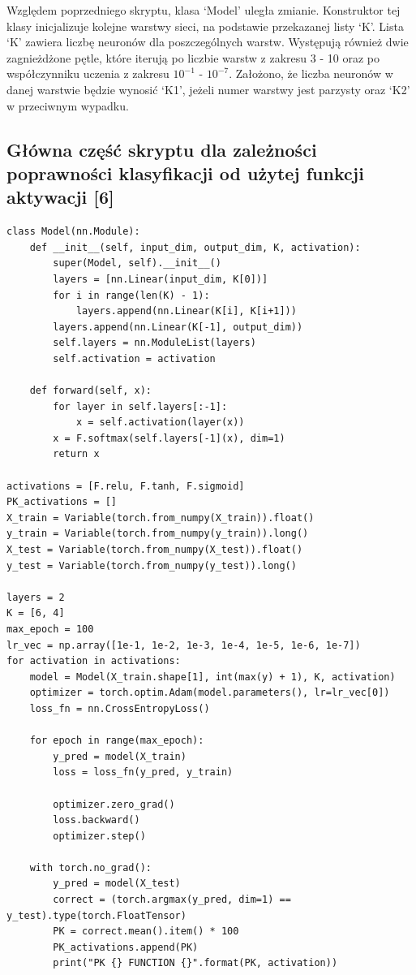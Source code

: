 \documentclass[a4paper]{article}
\begin{document}
\newpage
Względem poprzedniego skryptu, klasa `Model' uległa zmianie.
Konstruktor tej klasy inicjalizuje kolejne warstwy sieci, na podstawie przekazanej listy `K'.
Lista `K' zawiera liczbę neuronów dla poszczególnych warstw.
Występują również dwie zagnieżdżone pętle, które iterują po liczbie warstw z zakresu 3 - 10 oraz po współczynniku uczenia z zakresu $10^{-1}$ - $10^{-7}$.
Założono, że liczba neuronów w danej warstwie będzie wynosić `K1', jeżeli numer warstwy jest parzysty oraz `K2' w przeciwnym wypadku.

\subsection{Główna część skryptu dla zależności poprawności klasyfikacji od użytej funkcji aktywacji [6]}
\begin{verbatim}
class Model(nn.Module):
    def __init__(self, input_dim, output_dim, K, activation):
        super(Model, self).__init__()
        layers = [nn.Linear(input_dim, K[0])]
        for i in range(len(K) - 1):
            layers.append(nn.Linear(K[i], K[i+1]))
        layers.append(nn.Linear(K[-1], output_dim))
        self.layers = nn.ModuleList(layers)
        self.activation = activation

    def forward(self, x):
        for layer in self.layers[:-1]:
            x = self.activation(layer(x))
        x = F.softmax(self.layers[-1](x), dim=1)
        return x

activations = [F.relu, F.tanh, F.sigmoid]
PK_activations = []
X_train = Variable(torch.from_numpy(X_train)).float()
y_train = Variable(torch.from_numpy(y_train)).long()
X_test = Variable(torch.from_numpy(X_test)).float()
y_test = Variable(torch.from_numpy(y_test)).long()

layers = 2
K = [6, 4]
max_epoch = 100
lr_vec = np.array([1e-1, 1e-2, 1e-3, 1e-4, 1e-5, 1e-6, 1e-7])
for activation in activations:
    model = Model(X_train.shape[1], int(max(y) + 1), K, activation)
    optimizer = torch.optim.Adam(model.parameters(), lr=lr_vec[0])
    loss_fn = nn.CrossEntropyLoss()

    for epoch in range(max_epoch):
        y_pred = model(X_train)
        loss = loss_fn(y_pred, y_train)

        optimizer.zero_grad()
        loss.backward()
        optimizer.step()

    with torch.no_grad():
        y_pred = model(X_test)
        correct = (torch.argmax(y_pred, dim=1) == y_test).type(torch.FloatTensor)
        PK = correct.mean().item() * 100
        PK_activations.append(PK)
        print("PK {} FUNCTION {}".format(PK, activation))

\end{verbatim}
\end{document}
